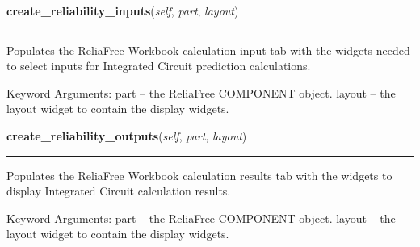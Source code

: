     \label{reliafree:integrated_circuits:ic:IntegratedCircuit:create_reliability_inputs}

    \vspace{0.5ex}

\hspace{.8\funcindent}\begin{boxedminipage}{\funcwidth}

    \raggedright \textbf{create\_reliability\_inputs}(\textit{self}, \textit{part}, \textit{layout})

    \vspace{-1.5ex}

    \rule{\textwidth}{0.5\fboxrule}
\setlength{\parskip}{2ex}
    Populates the ReliaFree Workbook calculation input tab with the widgets
    needed to select inputs for Integrated Circuit prediction calculations.

    Keyword Arguments: part   -- the ReliaFree COMPONENT object. layout -- 
    the layout widget to contain the display widgets.

\setlength{\parskip}{1ex}
    \end{boxedminipage}

    \label{reliafree:integrated_circuits:ic:IntegratedCircuit:create_reliability_outputs}

    \vspace{0.5ex}

\hspace{.8\funcindent}\begin{boxedminipage}{\funcwidth}

    \raggedright \textbf{create\_reliability\_outputs}(\textit{self}, \textit{part}, \textit{layout})

    \vspace{-1.5ex}

    \rule{\textwidth}{0.5\fboxrule}
\setlength{\parskip}{2ex}
    Populates the ReliaFree Workbook calculation results tab with the 
    widgets to display Integrated Circuit calculation results.

    Keyword Arguments: part   -- the ReliaFree COMPONENT object. layout -- 
    the layout widget to contain the display widgets.

\setlength{\parskip}{1ex}
    \end{boxedminipage}

